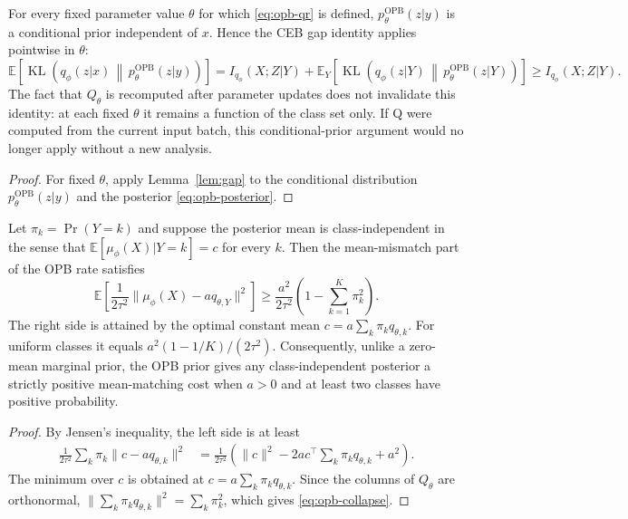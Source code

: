 \begin{proposition}
\label{prop:opb-certificate}
For every fixed parameter value $\theta$ for which \eqref{eq:opb-qr} is defined,
$p_{\theta}^{\mathrm{OPB}}(z|y)$ is a conditional prior independent of $x$. Hence
the CEB gap identity applies pointwise in $\theta$:
\begin{equation}
\mathbb{E}\left[
\operatorname{KL}\!\left(q_\phi(z|x)\,\middle\|\,
p_{\theta}^{\mathrm{OPB}}(z|y)\right)
\right]
= I_{q_\phi}(X;Z|Y)
+ \mathbb{E}_Y\left[
\operatorname{KL}\!\left(q_\phi(z|Y)\,\middle\|\,
p_{\theta}^{\mathrm{OPB}}(z|Y)\right)
\right]
\ge I_{q_\phi}(X;Z|Y).
\label{eq:opb-certificate}
\end{equation}
The fact that $Q_\theta$ is recomputed after parameter updates does not invalidate
this identity: at each fixed $\theta$ it remains a function of the class set only.
If Q were computed from the current input batch, this conditional-prior argument
would no longer apply without a new analysis.
\end{proposition}

\begin{proof}
For fixed $\theta$, apply Lemma~\ref{lem:gap} to the conditional distribution
$p_{\theta}^{\mathrm{OPB}}(z|y)$ and the posterior \eqref{eq:opb-posterior}.
\end{proof}

\begin{proposition}
\label{prop:opb-collapse}
Let $\pi_k=\Pr(Y=k)$ and suppose the posterior mean is class-independent in the
sense that $\mathbb{E}[\mu_\phi(X)|Y=k]=c$ for every $k$. Then the mean-mismatch
part of the OPB rate satisfies
\begin{equation}
\mathbb{E}\left[
\frac{1}{2\tau^2}
\|\mu_\phi(X)-a q_{\theta,Y}\|^2
\right]
\ge
\frac{a^2}{2\tau^2}
\left(1-\sum_{k=1}^{K}\pi_k^2\right).
\label{eq:opb-collapse}
\end{equation}
The right side is attained by the optimal constant mean
$c=a\sum_k\pi_k q_{\theta,k}$. For uniform classes it equals
$a^2(1-1/K)/(2\tau^2)$.
Consequently, unlike a zero-mean marginal prior, the OPB prior gives any
class-independent posterior a strictly positive mean-matching cost when $a>0$ and
at least two classes have positive probability.
\end{proposition}

\begin{proof}
By Jensen's inequality, the left side is at least
\begin{align*}
\frac{1}{2\tau^2}\sum_k\pi_k\|c-aq_{\theta,k}\|^2
&=\frac{1}{2\tau^2}
\left(\|c\|^2-2a c^{\top}\sum_k\pi_kq_{\theta,k}+a^2\right).
\end{align*}
The minimum over $c$ is obtained at
$c=a\sum_k\pi_kq_{\theta,k}$. Since the columns of $Q_\theta$ are orthonormal,
$\|\sum_k\pi_kq_{\theta,k}\|^2=\sum_k\pi_k^2$, which gives
\eqref{eq:opb-collapse}.
\end{proof}

